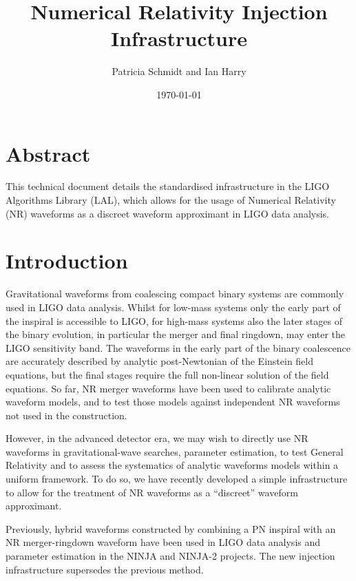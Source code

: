 \documentclass[a4paper, 11pt]{article}
\begin{document}

\title{Numerical Relativity Injection Infrastructure}
\author{Patricia Schmidt and Ian Harry}
\date{\today}

\maketitle

\section*{Abstract}
\label{sec:abs}
This technical document details the standardised infrastructure in the LIGO Algorithms Library (LAL), 
which allows for the usage of Numerical Relativity (NR) waveforms as a discreet waveform approximant
in LIGO data analysis. 

\section{Introduction}
\label{sec:intro}
Gravitational waveforms from coalescing compact binary systems are commonly used in LIGO data analysis.
Whilst for low-mass systems only the early part of the inspiral is accessible to LIGO, for high-mass systems 
also the later stages of the binary evolution, in particular the merger and final ringdown, may enter the LIGO
sensitivity band. The waveforms in the early part of the binary coalescence are accurately described by 
analytic post-Newtonian of the Einstein field equations, but the final stages require the full non-linear solution
of the field equations. So far, NR merger waveforms have been used to calibrate analytic waveform models,
and to test those models against independent NR waveforms not used in the construction. 

However, in the advanced detector era, we may wish to directly use NR waveforms in gravitational-wave searches,
parameter estimation, to test General Relativity and to assess the systematics of analytic waveforms models within
a uniform framework. To do so, we have recently developed a simple infrastructure to allow for the treatment of
NR waveforms as a ``discreet'' waveform approximant. 

Previously, hybrid waveforms constructed by combining a PN inspiral with an NR merger-ringdown waveform have been
used in LIGO data analysis and parameter estimation in the NINJA and NINJA-2 projects. The new injection infrastructure
supersedes the previous method.
\end{document}
